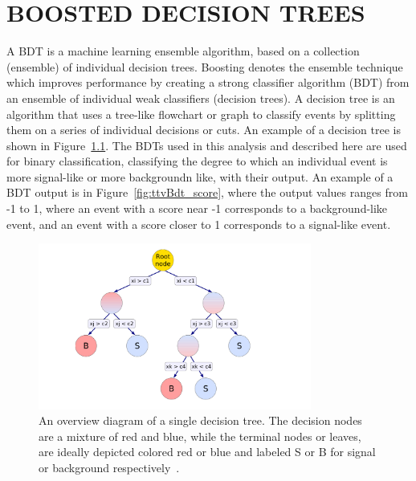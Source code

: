 %
%

\chapter{BOOSTED DECISION TREES}
\label{app:bdts}

A BDT is a machine learning ensemble algorithm, based on a collection (ensemble) of individual decision trees. Boosting denotes the ensemble technique
which improves performance by creating a strong classifier algorithm (BDT) from an ensemble of individual weak classifiers (decision trees). A decision tree
is an algorithm that uses a tree-like flowchart or graph to classify events by splitting them on a series of individual decisions or cuts. An example of a decision tree
is shown in Figure~\ref{fig:dec_tree}. The BDTs used in this analysis and described here are used for binary classification, classifying the degree to which an
individual event is more signal-like or more backgroundn like, with their output.
An example of a BDT output is in Figure~\ref{fig:ttvBdt_score}, where the output values ranges from -1 to 1, where an event with a score near -1 corresponds
to a background-like event, and an event with a score closer to 1 corresponds to a signal-like event.

\begin{figure}[hbtp]
 \begin{center}
   \includegraphics[width=0.8\textwidth]{ap2_figs/decision_tree.pdf}
   \caption[A decision tree diagram.]{An overview diagram of a single decision tree. The decision nodes are a mixture of red and blue,
     while the terminal nodes or leaves, are ideally depicted colored red or blue and labeled S or B for signal or background respectively~\cite{tmva}.}
   \label{fig:dec_tree}
 \end{center}
\end{figure}

